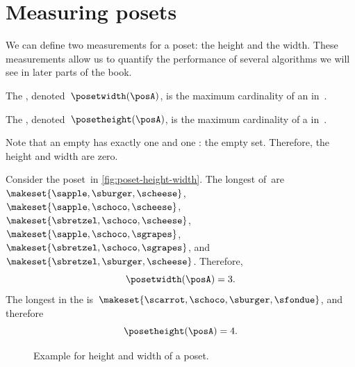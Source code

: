 
\section{Measuring posets}
We can define two measurements for a poset: the height and the width.
These measurements allow us to quantify the performance of several algorithms we will see in later parts of the book.
\begin{definition}
    \label{def:poset-width}
    The , denoted~$\posetwidth(\posA)$, is the maximum cardinality of an  in~\posA.
\end{definition}

\begin{definition}
    \label{def:poset-height}
    The , denoted~$\posetheight(\posA)$, is the maximum cardinality of a  in~\posA.
\end{definition}

Note that an empty  has exactly one  and one : the empty set.
Therefore, the height and width are zero.

\begin{example}
    Consider the poset~\posA in \cref{fig:poset-height-width}.
    The longest  of~\posA are~$\makeset{\sapple, \sburger, \scheese}$, $\makeset{\sapple, \schoco, \scheese}$, $\makeset{\sbretzel, \schoco, \scheese}$, $\makeset{\sapple, \schoco, \sgrapes}$, $\makeset{\sbretzel, \schoco, \sgrapes}$, and~$\makeset{\sbretzel, \sburger, \scheese}$.
    Therefore,
    \begin{equation}\label{eq:poset-height-width-1}
        \posetwidth(\posA)=3.
    \end{equation}
    The longest  in the  is~$\makeset{\scarrot,\schoco,\sburger,\sfondue}$, and therefore
    \begin{equation}\label{eq:poset-height-width-2}
        \posetheight(\posA)=4.
    \end{equation}
\end{example}

\begin{figure}[h]
    \caption{Example for height and width of a poset.
    }
\end{figure}

